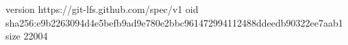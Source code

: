 version https://git-lfs.github.com/spec/v1
oid sha256:e9b2263094d4e5befb9ad9e780e2bbc961472994112488ddeedb90322ee7aab1
size 22004
